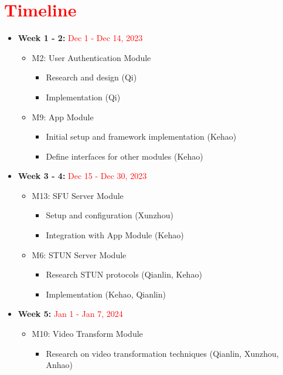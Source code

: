 \documentclass[12pt, titlepage]{article}
\newcommand{\rt}[1]{\textcolor{red}{#1}}
\begin{document}
\section{\rt{Timeline}}

\begin{itemize}
  \item \textbf{Week 1 - 2:} \rt{Dec 1 - Dec 14, 2023}
  \begin{itemize}
      \item M2: User Authentication Module
      \begin{itemize}
          \item Research and design (Qi)
          \item Implementation (Qi)
      \end{itemize}
      \item M9: App Module
      \begin{itemize}
          \item Initial setup and framework implementation (Kehao)
          \item Define interfaces for other modules (Kehao)
      \end{itemize}
  \end{itemize}
  \item \textbf{Week 3 - 4:} \rt{Dec 15 - Dec 30, 2023}
  \begin{itemize}
      \item M13: SFU Server Module
      \begin{itemize}
          \item Setup and configuration (Xunzhou)
          \item Integration with App Module (Kehao)
      \end{itemize}
      \item M6: STUN Server Module
      \begin{itemize}
          \item Research STUN protocols (Qianlin, Kehao)
          \item Implementation (Kehao, Qianlin)
      \end{itemize}
  \end{itemize}
  \item \textbf{Week 5:} \rt{Jan 1 - Jan 7, 2024}
  \begin{itemize}
      \item M10: Video Transform Module
      \begin{itemize}
          \item Research on video transformation techniques (Qianlin, Xunzhou, Anhao)

\end{itemize}
\end{itemize}
\end{itemize}
\end{document}
